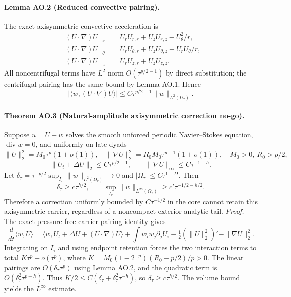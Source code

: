 \paragraph{Lemma AO.2 (Reduced convective pairing).}
The exact axisymmetric convective acceleration is
\[
\begin{aligned}
[(U\cdot\nabla)U]_r&=U_rU_{r,r}+U_zU_{r,z}-U_\theta^2/r,\\
[(U\cdot\nabla)U]_\theta&=U_rU_{\theta,r}+U_zU_{\theta,z}+U_rU_\theta/r,\\
[(U\cdot\nabla)U]_z&=U_rU_{z,r}+U_zU_{z,z}.
\end{aligned}
\]
All noncentrifugal terms have $L^2$ norm $O(\tau^{p/2-1})$ by direct substitution; the centrifugal pairing has the same bound by Lemma AO.1. Hence
\[
\boxed{|\langle w,(U\cdot\nabla)U\rangle|
\le C\tau^{p/2-1}\|w\|_{L^2(\Omega_\tau)}}.
\]

\paragraph{Theorem AO.3 (Natural-amplitude axisymmetric correction no-go).}
Suppose $u=U+w$ solves the smooth unforced periodic Navier--Stokes equation, $\operatorname{div}w=0$, and uniformly on late dyads
\[
\|U\|_2^2=M_0\tau^p(1+o(1)),\quad
\|\nabla U\|_2^2=R_0M_0\tau^{p-1}(1+o(1)),\quad
M_0>0,\ R_0>p/2,
\]
\[
\|U_t+\Delta U\|_2\le C\tau^{p/2-1},\qquad
\|\nabla U\|_\infty\le C\tau^{-1-h}.
\]
Let $\delta_\tau=\tau^{-p/2}\sup_{I_\tau}\|w\|_{L^2(\Omega_\tau)}\to0$ and $|\Omega_\tau|\le C\tau^{1+D}$. Then
\[
\boxed{\delta_\tau\ge c\tau^{h/2},\qquad
\sup_{I_\tau}\|w\|_{L^\infty(\Omega_\tau)}\ge c'\tau^{-1/2-h/2}.}
\]
Therefore a correction uniformly bounded by $C\tau^{-1/2}$ in the core cannot retain this axisymmetric carrier, regardless of a noncompact exterior analytic tail.
\emph{Proof.} The exact pressure-free carrier pairing identity gives
\[
\frac d{dt}\langle w,U\rangle=
\langle w,U_t+\Delta U+(U\cdot\nabla)U\rangle+
\int w_iw_j\partial_jU_i-\tfrac12(\|U\|_2^2)'-\|\nabla U\|_2^2.
\]
Integrating on $I_\tau$ and using endpoint retention forces the two interaction terms to total $K\tau^p+o(\tau^p)$, where $K=M_0(1-2^{-p})(R_0-p/2)/p>0$. The linear pairings are $O(\delta_\tau\tau^p)$ using Lemma AO.2, and the quadratic term is $O(\delta_\tau^2\tau^{p-h})$. Thus $K/2\le C(\delta_\tau+\delta_\tau^2\tau^{-h})$, so $\delta_\tau\ge c\tau^{h/2}$. The volume bound yields the $L^\infty$ estimate.

